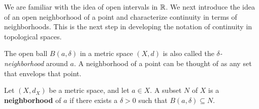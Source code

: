 \begin{comment}

\item  Let $a = (3,2)$. If $x \neq a$ in this space, then $d(x,a) = 1$. So the only element in $B((3,2),1)$ in this space is $a$ itself, as shown at right in Figure \ref{F:Balls_4_5}. However, if $r > 1$, then every element in $\R^2$ is in $B(a,r)$. 

\ee

\end{comment}


\label{sec_neighborhoods}

We are familiar with the idea of open intervals in $\mathbb{R}$. We next introduce the idea of an open neighborhood of a point and characterize continuity in terms of neighborhoods. This is the next step in developing the notation of continuity in topological spaces. 

The open ball $B(a, \delta)$ in a metric space $(X,d)$ is also called the \emph{$\delta$-neighborhood} around $a$. A neighborhood of a point can be thought of as any set that envelops that point. 

\begin{definition} Let $(X, d_X)$ be a metric space, and let $a \in X$. A subset $N$ of $X$ is a \textbf{neighborhood} of $a$ if there exists a $\delta > 0$ such that $B(a, \delta) \subseteq N$. 
\end{definition} 


